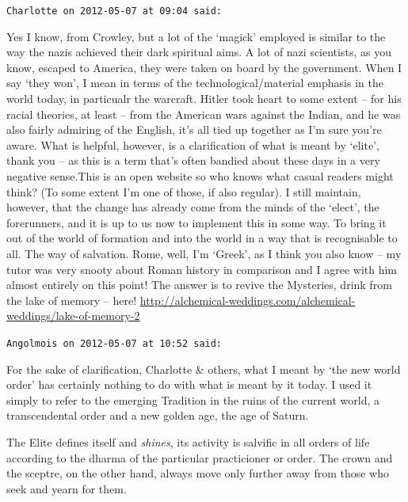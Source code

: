 \begin{footnotesize}
\begin{sffamily}
\hfill

\texttt{Charlotte on 2012-05-07 at 09:04 said:}

Yes I know, from Crowley, but a lot of the `magick' employed is similar to the way the nazis achieved their dark spiritual aims. A lot of nazi scientists, as you know, escaped to America, they were taken on board by the government. When I say `they won', I mean in terms of the technological/material emphasis in the world today, in particualr the warcraft. Hitler took heart to some extent -- for his racial theories, at least -- from the American wars against the Indian, and he was also fairly admiring of the English, it's all tied up together as I'm sure you're aware. What is helpful, however, is a clarification of what is meant by `elite', thank you -- as this is a term that's often bandied about these days in a very negative sense.This is an open website so who knows what casual readers might think? (To some extent I'm one of those, if also regular). I still maintain, however, that the change has already come from the minds of the `elect', the forerunners, and it is up to us now to implement this in some way. To bring it out of the world of formation and into the world in a way that is recognisable to all. The way of salvation. Rome, well, I'm `Greek', as I think you also know -- my tutor was very snooty about Roman history in comparison and I agree with him almost entirely on this point! The answer is to revive the Mysteries, drink from the lake of memory -- here!
\url{http://alchemical-weddings.com/alchemical-weddings/lake-of-memory-2}

\hfill

\texttt{Angolmois on 2012-05-07 at 10:52 said:}

For the sake of clarification, Charlotte \& others, what I meant by `the new world order' has certainly nothing to do with what is meant by it today. I used it simply to refer to the emerging Tradition in the ruins of the current world, a transcendental order and a new golden age, the age of Saturn.

The Elite defines itself and \textit{shines}, its activity is salvific in all orders of life according to the dharma of the particular practicioner or order. The crown and the sceptre, on the other hand, always move only further away from those who seek and yearn for them.

\hfill

\end{sffamily}
\end{footnotesize}

